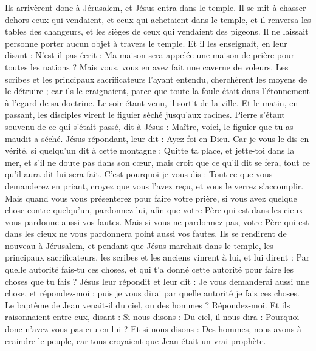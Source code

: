 \begin{multicols}{2}
Ils arrivèrent donc à Jérusalem, et Jésus entra dans le temple. Il se mit à chasser dehors ceux qui vendaient, et ceux qui achetaient dans le temple, et il renversa les tables des changeurs, et les sièges de ceux qui vendaient des pigeons.
Il ne laissait personne porter aucun objet à travers le temple.
Et il les enseignait, en leur disant : N'est-il pas écrit : Ma maison sera appelée une maison de prière pour toutes les nations ? Mais vous, vous en avez fait une caverne de voleurs.
Les scribes et les principaux sacrificateurs l’ayant entendu, cherchèrent les moyens de le détruire ; car ils le craignaient, parce que toute la foule était dans l'étonnement à l'egard de sa doctrine.
Le soir étant venu, il sortit de la ville.
Et le matin, en passant, les disciples virent le figuier séché jusqu’aux racines.
Pierre s'étant souvenu de ce qui s'était passé, dit à Jésus : Maître, voici, le figuier que tu as maudit a séché.
Jésus répondant, leur dit : Ayez foi en Dieu.
Car je vous le dis en vérité, si quelqu’un dit à cette montagne : Quitte ta place, et jette-toi dans la mer, et s'il ne doute pas dans son cœur, mais croit que ce qu’il dit se fera, tout ce qu’il aura dit lui sera fait.
C'est pourquoi je vous dis : Tout ce que vous demanderez en priant, croyez que vous l’avez reçu, et vous le verrez s’accomplir.
Mais quand vous vous présenterez pour faire votre prière, si vous avez quelque chose contre quelqu'un, pardonnez-lui, afin que votre Père qui est dans les cieux vous pardonne aussi vos fautes.
Mais si vous ne pardonnez pas, votre Père qui est dans les cieux ne vous pardonnera point aussi vos fautes.
Ils se rendirent de nouveau à Jérusalem, et pendant que Jésus marchait dans le temple, les principaux sacrificateurs, les scribes et les anciens vinrent à lui,
et lui dirent : Par quelle autorité fais-tu ces choses, et qui t'a donné cette autorité pour faire les choses que tu fais ?
Jésus leur répondit et leur dit : Je vous demanderai aussi une chose, et répondez-moi ; puis je vous dirai par quelle autorité je fais ces choses.
Le baptême de Jean venait-il du ciel, ou des hommes ? Répondez-moi.
Et ils raisonnaient entre eux, disant : Si nous disons : Du ciel, il nous dira : Pourquoi donc n’avez-vous pas cru en lui ?
Et si nous disons : Des hommes, nous avons à craindre le peuple, car tous croyaient que Jean était un vrai prophète.

\end{multicols}

